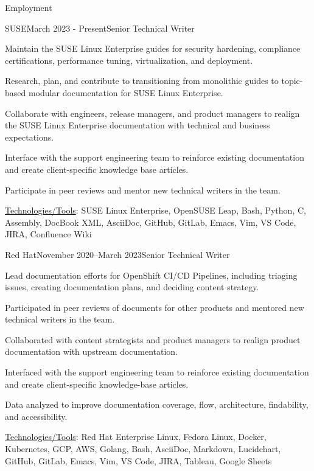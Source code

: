 \documentclass{resume} %
\begin{document}
\begin{rSection}{Employment}

\begin{rSubsection}{SUSE}{March 2023 - Present}{Senior Technical Writer}{}
\item Maintain the SUSE Linux Enterprise guides for security hardening, compliance certifications, performance tuning, virtualization, and deployment.
\item Research, plan, and contribute to transitioning from monolithic guides to topic-based modular documentation for SUSE Linux Enterprise.
\item Collaborate with engineers, release managers, and product managers to realign the SUSE Linux Enterprise documentation with technical and business expectations.
\item Interface with the support engineering team to reinforce existing documentation and create client-specific knowledge base articles.
\item Participate in peer reviews and mentor new technical writers in the team. 
\item \underline{Technologies/Tools}: SUSE Linux Enterprise, OpenSUSE Leap, Bash, Python, C, Assembly, DocBook XML, AsciiDoc, GitHub, GitLab, Emacs, Vim, VS Code, JIRA, Confluence Wiki 
\end{rSubsection}


\begin{rSubsection}{Red Hat}{November 2020–March 2023}{Senior Technical Writer}{}
\item Lead documentation efforts for OpenShift CI/CD Pipelines, including triaging issues, creating documentation plans, and deciding content strategy.
\item Participated in peer reviews of documents for other products and mentored new technical writers in the team. 
\item Collaborated with content strategists and product managers to realign product documentation with upstream documentation.
\item Interfaced with the support engineering team to reinforce existing documentation and create client-specific knowledge-base articles.
\item Data analyzed to improve documentation coverage, flow, architecture, findability, and accessibility. 
\item \underline{Technologies/Tools}: Red Hat Enterprise Linux, Fedora Linux, Docker, Kubernetes, GCP, AWS, Golang, Bash, AsciiDoc, Markdown, Lucidchart, GitHub, GitLab, Emacs, Vim, VS Code, JIRA, Tableau, Google Sheets 
\end{rSubsection}


\end{rSection}
\end{document}
